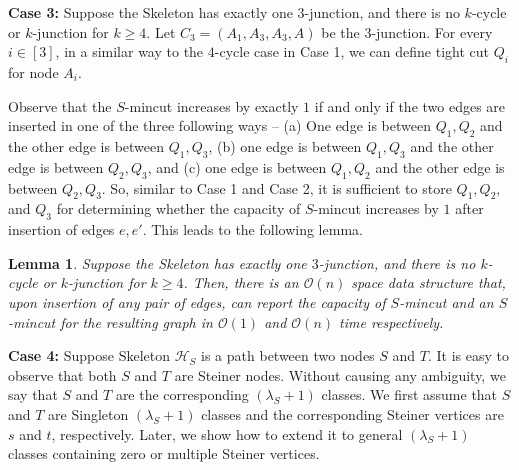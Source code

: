 \documentclass[letterpaper,11pt]{article}
\newtheorem{lemma}{Lemma}[]
\begin{document}
\noindent
\textbf{Case 3:} Suppose the Skeleton has exactly one $3$-junction, and there is no $k$-cycle or $k$-junction for $k\ge 4$. Let $C_3=(A_1,A_3,A_3,A)$ be the $3$-junction.  For every $i\in [3]$, in a similar way to the $4$-cycle case in Case 1, we can define tight cut $Q_i$ for node $A_i$. 

Observe that the $S$-mincut increases by exactly $1$ if and only if the two edges are inserted in one of the three following ways -- (a) One edge is between $Q_1,Q_2$ and the other edge is between $Q_1,Q_3$, (b) one edge is between $Q_1,Q_3$ and the other edge is between $Q_2,Q_3$, and (c) one edge is between $Q_1,Q_2$ and the other edge is between $Q_2,Q_3$. So, similar to Case 1 and Case 2, it is sufficient to store $Q_1,Q_2,$ and $Q_3$ for determining whether the capacity of $S$-mincut increases by $1$ after insertion of edges $e,e'$. This leads to the following lemma.
\begin{lemma} \label{lem : case 3}
      Suppose the Skeleton has exactly one $3$-junction, and there is no $k$-cycle or $k$-junction for $k\ge 4$. Then, there is an ${\mathcal O}(n)$ space data structure that, upon insertion of any pair of edges, can report the capacity of $S$-mincut and an $S$-mincut for the resulting graph in ${\mathcal O}(1)$ and ${\mathcal O}(n)$ time respectively. 
\end{lemma}

\noindent
\textbf{Case 4:} Suppose Skeleton ${\mathcal H}_S$ is a path between two nodes $S$ and $T$. It is easy to observe that both $S$ and $T$ are Steiner nodes. Without causing any ambiguity, we say that $S$ and $T$ are the corresponding $(\lambda_S+1)$ classes. We first assume that $S$ and $T$ are Singleton $(\lambda_S+1)$ classes and the corresponding Steiner vertices are $s$ and $t$, respectively. Later, we show how to extend it to general $(\lambda_S+1)$ classes containing zero or multiple Steiner vertices.
\end{document}
